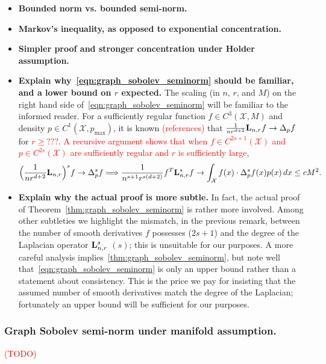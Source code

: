 \documentclass{article}
\newcommand{\1}{\mathbf{1}}
\newcommand{\Lap}{{\bf L}}
\newcommand{\Xset}{\mathcal{X}}
\theoremstyle{alden}
\theoremstyle{aldenthm}
\theoremstyle{definition}
\theoremstyle{remark}
\begin{document}
\begin{itemize}
	\item \textbf{Bounded norm vs. bounded semi-norm.}
	\item \textbf{Markov's inequality, as opposed to exponential concentration.}
	\item \textbf{Simpler proof and stronger concentration under Holder assumption.}
	\item \textbf{Explain why~\eqref{eqn:graph_sobolev_seminorm} should be familiar, and a lower bound on $r$ expected.} The scaling (in $n$, $r$, and $M$) on the right hand side of~\eqref{eqn:graph_sobolev_seminorm} will be familiar to the informed reader. For a sufficiently regular function $f \in C^3(\Xset,M)$ and density $p \in C^1(\Xset,p_{\max})$, it is known \textcolor{red}{(references)} that $\frac{1}{nr^{d + 2}}\Lap_{n,r}f \to \Delta_pf$ for \textcolor{red}{$r \geq ???$}. \textcolor{red}{A recursive argument shows that when $f \in C^{2s + 1}(\Xset)$ and $p \in C^{2s}(\Xset)$ are sufficiently regular and $r$ is sufficiently large},
	\begin{equation*}
	\Bigl(\frac{1}{nr^{d + 2}}\Lap_{n,r}\Bigr)^s f \to \Delta_p^sf \Longrightarrow \frac{1}{n^{s + 1} r^{s(d + 2)}} f^T \Lap_{n,r}^s f \to \int_{\Xset} f(x) \cdot  \Delta_p^sf(x) p(x) \,dx \leq c M^2.
	\end{equation*}
	\item \textbf{Explain why the actual proof is more subtle.} In fact, the actual proof of Theorem~\ref{thm:graph_sobolev_seminorm} is rather more involved. Among other subtleties we highlight the mismatch, in the previous remark, between the number of smooth derivatives $f$ possesses ($2s + 1$) and the degree of the Laplacian operator $\Lap_{{n,r}}^s$ $(s)$; this is unsuitable for our purposes. A more careful analysis implies~\eqref{thm:graph_sobolev_seminorm}, but note well that~\eqref{eqn:graph_sobolev_seminorm} is only an upper bound rather than a statement about consistency. This is the price we pay for insisting that the assumed number of smooth derivatives match the degree of the Laplacian; fortunately an upper bound will be sufficient for our purposes.
\end{itemize}

\subsubsection{Graph Sobolev semi-norm under manifold assumption.}

\textcolor{red}{(TODO)}
\end{document}
